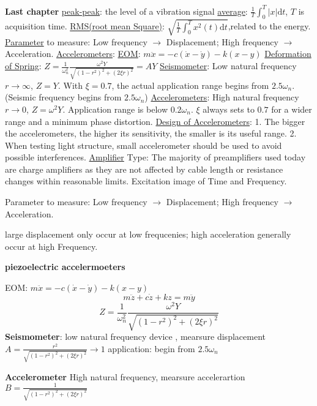 \documentclass{article}
\begin{document}
\begin{multicols*}{3}
  \noindent\textbf{Last chapter}
  \underline{peak-peak}: the level of a vibration signal
  \underline{average}: $\frac{1}{T}\int_{0}^{T}|x|\text{d}t$, $T$ is acquisition time.
  \underline{RMS(root mean Square)}: $\sqrt{\frac{1}{T}\int_{0}^{T}x^{2}(t)\text{d}t}$,related  to the energy.
  \underline{Parameter} to measure: Low frequency $\rightarrow$ Displacement; High frequency $\rightarrow$ Acceleration.
  \underline{Accelerometers}:
  \underline{EOM}: $m \ddot{x} = -c(\dot{x}-\dot{y}) - k(x-y)$
  \underline{Deformation of Spring}: $Z = \frac{1}{\omega_n^2} \frac{\omega^2Y}{\sqrt{(1-r^2)^2+(2\xi r)^2}} = A Y$
  \underline{Seismometer}: Low natural frequency $r\rightarrow\infty$, $Z = Y$. With $\xi=0.7$, the actual application range begins from $2.5\omega_n$. (Seismic frequency begins from $2.5\omega_n$)
  \underline{Accelerometers}: High natural frequency $r\rightarrow0$, $Z = \omega^2Y$. Application range is below $0.2\omega_n$. $\xi$ always sets to $0.7$ for a wider range and a minimum phase distortion.
  \underline{Design of Accelerometers}: 1. The bigger the accelerometers, the higher its sensitivity, the smaller is its useful range. 2. When testing light structure, small accelerometer should be used to avoid possible interferences.
  \underline{Amplifier} Type: The majority of preamplifiers used today are charge amplifiers as they are not affected by cable length or resistance changes within reasonable limits.
  Excitation image of Time and Frequency.

Parameter to measure: Low frequency $\rightarrow$ Displacement; High frequency $\rightarrow$ Acceleration.



large displacement only occur at low frequcenies; high acceleration generally occur at high Frequency.

\noindent\textbf{piezoelectric accelermoeters}

EOM: $m \ddot{x} = -c(\dot{x}-\dot{y}) - k(x-y)$
\begin{equation*}
  m\ddot{z}+c\dot{z}+kz=m\ddot{y}
\end{equation*}
\begin{equation*}
  Z=\frac{1}{\omega_{n}^{2}}\frac{\omega^{2}Y}{\sqrt{(1-r^{2})^{2}+(2\xi r)^{2}}}
\end{equation*}
\textbf{Seismometer}: low natural frequency device , mearsure displacement
$A=\frac{r^{2}}{\sqrt{(1-r^{2})^{2}+(2\xi r)^{2}}}\rightarrow 1$
application: begin from $2.5 \omega_{n}$

\textbf{Accelerometer}
High natural frequency, mearsure accelerartion
$B=\frac{1}{\sqrt{(1-r^{2})^{2}+(2\xi r)^{2}}}$


\end{multicols*}
\end{document}
